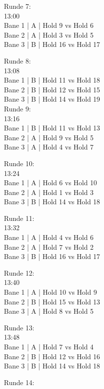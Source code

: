 \begin{multicols}{2}
\par
Runde 7:\\
13:00\\
Bane  1 | A | Hold 9 vs Hold 6\\
Bane  2 | A | Hold 3 vs Hold 5\\
Bane  3 | B | Hold 16 vs Hold 17\\
\par
Runde 8:\\
13:08\\
Bane  1 | B | Hold 11 vs Hold 18\\
Bane  2 | B | Hold 12 vs Hold 15\\
Bane  3 | B | Hold 14 vs Hold 19\\
Runde 9:\\
13:16\\
Bane  1 | B | Hold 11 vs Hold 13\\
Bane  2 | A | Hold 9 vs Hold 5\\
Bane  3 | A | Hold 4 vs Hold 7\\
\par
Runde 10:\\
13:24\\
Bane  1 | A | Hold 6 vs Hold 10\\
Bane  2 | A | Hold 1 vs Hold 3\\
Bane  3 | B | Hold 14 vs Hold 18\\
\par
Runde 11:\\
13:32\\
Bane  1 | A | Hold 4 vs Hold 6\\
Bane  2 | A | Hold 7 vs Hold 2\\
Bane  3 | B | Hold 16 vs Hold 17\\
\par
Runde 12:\\
13:40\\
Bane  1 | A | Hold 10 vs Hold 9\\
Bane  2 | B | Hold 15 vs Hold 13\\
Bane  3 | A | Hold 8 vs Hold 5\\
\par
Runde 13:\\
13:48\\
Bane  1 | A | Hold 7 vs Hold 4\\
Bane  2 | B | Hold 12 vs Hold 16\\
Bane  3 | B | Hold 14 vs Hold 18\\
\par
Runde 14:\\

\end{multicols}
